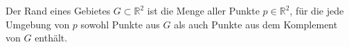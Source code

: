 \begin{definition}
    Der Rand eines Gebietes $G \subset \mathbb{R}^2$ ist die Menge aller Punkte $p \in \mathbb{R}^2$, für die jede Umgebung von $p$ sowohl Punkte aus $G$ als auch Punkte aus dem Komplement von $G$ enthält.
\end{definition}